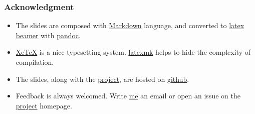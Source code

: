 \documentclass[11pt,ignorenonframetext,]{beamer}
\begin{document}
\begin{frame}\frametitle{Acknowledgment}

\begin{itemize}
\item
  The slides are composed with
  \href{http://daringfireball.net/projects/markdown/}{Markdown}
  language, and converted to
  \href{https://bitbucket.org/rivanvx/beamer/wiki/Home}{latex beamer}
  with \href{http://johnmacfarlane.net/pandoc/}{pandoc}.\\
\item
  \href{http://www.tug.org/xetex/}{XeTeX} is a nice typesetting system.
  \href{http://www.phys.psu.edu/~collins/software/latexmk-jcc/}{latexmk}
  helps to hide the complexity of compilation.
\item
  The slides, along with the
  \href{https://github.com/weijianwen/GitForBeginners}{project}, are
  hosted on \href{https://github.com/}{github}.
\item
  Feedback is always welcomed. Write
  \href{mailto:weijianwen@sjtu.edu.cn}{me} an email or open an issue on the
  \href{https://github.com/weijianwen/GitForBeginners}{project}
  homepage.

\end{itemize}
\end{frame}
\end{document}
